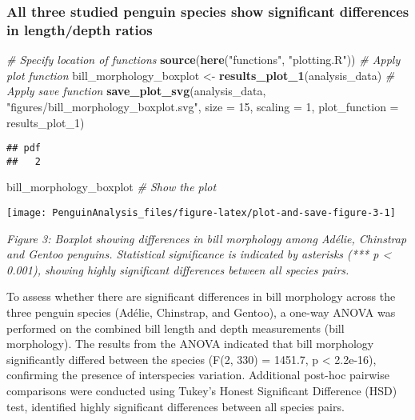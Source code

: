 \documentclass[
]{article}
\newenvironment{Shaded}{\begin{snugshade}}{\end{snugshade}}
\newcommand{\AttributeTok}[1]{\textcolor[rgb]{0.13,0.29,0.53}{#1}}
\newcommand{\CommentTok}[1]{\textcolor[rgb]{0.56,0.35,0.01}{\textit{#1}}}
\newcommand{\DecValTok}[1]{\textcolor[rgb]{0.00,0.00,0.81}{#1}}
\newcommand{\FunctionTok}[1]{\textcolor[rgb]{0.13,0.29,0.53}{\textbf{#1}}}
\newcommand{\NormalTok}[1]{#1}
\newcommand{\OtherTok}[1]{\textcolor[rgb]{0.56,0.35,0.01}{#1}}
\newcommand{\StringTok}[1]{\textcolor[rgb]{0.31,0.60,0.02}{#1}}
\begin{document}
\subsubsection{All three studied penguin species show significant
differences in length/depth
ratios}\label{all-three-studied-penguin-species-show-significant-differences-in-lengthdepth-ratios}

\begin{Shaded}
\begin{Highlighting}[]
\CommentTok{\# Specify location of functions }
\FunctionTok{source}\NormalTok{(}\FunctionTok{here}\NormalTok{(}\StringTok{"functions"}\NormalTok{, }\StringTok{"plotting.R"}\NormalTok{))}
\CommentTok{\# Apply plot function}
\NormalTok{bill\_morphology\_boxplot }\OtherTok{\textless{}{-}} \FunctionTok{results\_plot\_1}\NormalTok{(analysis\_data)}
\CommentTok{\# Apply save function}
\FunctionTok{save\_plot\_svg}\NormalTok{(analysis\_data, }
                      \StringTok{"figures/bill\_morphology\_boxplot.svg"}\NormalTok{, }
                      \AttributeTok{size =} \DecValTok{15}\NormalTok{, }
                      \AttributeTok{scaling =} \DecValTok{1}\NormalTok{, }
                      \AttributeTok{plot\_function =}\NormalTok{ results\_plot\_1)}
\end{Highlighting}
\end{Shaded}

\begin{verbatim}
## pdf 
##   2
\end{verbatim}

\begin{Shaded}
\begin{Highlighting}[]
\NormalTok{bill\_morphology\_boxplot }\CommentTok{\# Show the plot}
\end{Highlighting}
\end{Shaded}

\begin{center}\texttt{[image: PenguinAnalysis\_files/figure-latex/plot-and-save-figure-3-1]} \end{center}

\emph{Figure 3: Boxplot showing differences in bill morphology among
Adélie, Chinstrap and Gentoo penguins. Statistical significance is
indicated by asterisks (*** p \textless{} 0.001), showing highly
significant differences between all species pairs.}

To assess whether there are significant differences in bill morphology
across the three penguin species (Adélie, Chinstrap, and Gentoo), a
one-way ANOVA was performed on the combined bill length and depth
measurements (bill morphology). The results from the ANOVA indicated
that bill morphology significantly differed between the species (F(2,
330) = 1451.7, p \textless{} 2.2e-16), confirming the presence of
interspecies variation. Additional post-hoc pairwise comparisons were
conducted using Tukey's Honest Significant Difference (HSD) test,
identified highly significant differences between all species pairs.
\end{document}
